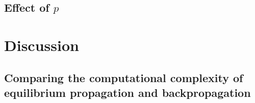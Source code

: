 \documentclass[utf8]{frontiersSCNS}
\begin{document}
\subsection{Effect of $p$}
\label{sec:mnist_1epoch}

%

\section{Discussion}

\subsection{Comparing the computational complexity of equilibrium propagation and backpropagation}
\end{document}
